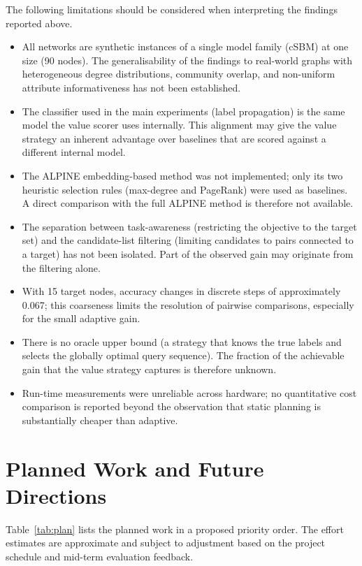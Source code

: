 \documentclass[11pt,a4paper]{article}
\begin{document}
The following limitations should be considered when interpreting the findings reported above.
\begin{itemize}[leftmargin=1.5em,itemsep=0.2em]
\item All networks are synthetic instances of a single model family (cSBM) at one size (90 nodes).
The generalisability of the findings to real-world graphs with heterogeneous degree distributions,
community overlap, and non-uniform attribute informativeness has not been established.
\item The classifier used in the main experiments (label propagation) is the same model the value
scorer uses internally. This alignment may give the value strategy an inherent advantage over
baselines that are scored against a different internal model.
\item The ALPINE embedding-based method was not implemented; only its two heuristic selection rules
(max-degree and PageRank) were used as baselines. A direct comparison with the full ALPINE
method is therefore not available.
\item The separation between task-awareness (restricting the objective to the target set) and
the candidate-list filtering (limiting candidates to pairs connected to a target) has not been
isolated. Part of the observed gain may originate from the filtering alone.
\item With 15 target nodes, accuracy changes in discrete steps of approximately 0.067; this
coarseness limits the resolution of pairwise comparisons, especially for the small adaptive
gain.
\item There is no oracle upper bound (a strategy that knows the true labels and selects the
globally optimal query sequence). The fraction of the achievable gain that the value strategy
captures is therefore unknown.
\item Run-time measurements were unreliable across hardware; no quantitative cost comparison
is reported beyond the observation that static planning is substantially cheaper than adaptive.
\end{itemize}

\section{Planned Work and Future Directions}
\label{sec:plan}
Table~\ref{tab:plan} lists the planned work in a proposed priority order. The effort estimates
are approximate and subject to adjustment based on the project schedule and mid-term evaluation
feedback.
\end{document}
